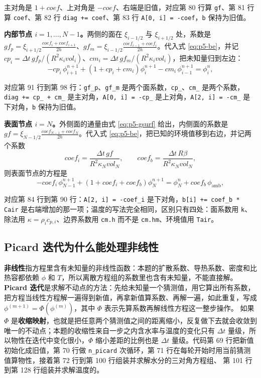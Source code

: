 主对角是 $1+coef$、上对角是 $-coef$、右端是旧值，对应第 80 行算 \texttt{gf}、第 81 行算 \texttt{coef}、第 82 行 \texttt{diag += coef}、第 83 行 \texttt{A[0, i] = -coef}，\texttt{b} 保持为旧值。

\textbf{内部节点 $i=1,\dots,N-1$。}两侧的面在 $\xi_{i-1/2}$ 与 $\xi_{i+1/2}$ 处，系数是 $gf_p=\xi_{i+1/2}\frac{coef_i+coef_{i+1}}{2h}$、$gf_m=\xi_{i-1/2}\frac{coef_{i-1}+coef_i}{2h}$。代入式 \eqref{eq:p5-be}，并记 $cp_i=\Delta t\,gf_p/(R^2\kappa_ivol_i)$、$cm_i=\Delta t\,gf_m/(R^2\kappa_ivol_i)$，把未知量归到左边：
\begin{equation}
-cp_i\,\phi_{i+1}^{n+1}+\left(1+cp_i+cm_i\right)\phi_i^{n+1}-cm_i\,\phi_{i-1}^{n+1}=\phi_i^{n},
\end{equation}

对应第 91 行到第 98 行：\texttt{gf\_p}、\texttt{gf\_m} 是两个面系数，\texttt{cp\_}、\texttt{cm\_} 是两个系数，\texttt{diag += cp\_ + cm\_} 是主对角，\texttt{A[0, i] = -cp\_} 是上对角，\texttt{A[2, i] = -cm\_} 是下对角，\texttt{b} 保持为旧值。

\textbf{表面节点 $i=N$。}外侧面的通量由式 \eqref{eq:p5-gsurf} 给出，内侧面的系数是 $gf=\xi_{N-1/2}\frac{coef_{N-1}+coef_N}{2h}$。代入式 \eqref{eq:p5-be}，把已知的环境值移到右边，并记两个系数
\begin{equation}
coef_i=\frac{\Delta t\,gf}{R^2\kappa_Nvol_N},\qquad
coef_b=\frac{\Delta t\,R\beta}{R^2\kappa_Nvol_N},
\label{eq:p5-surfcoef}
\end{equation}
则表面节点的方程是
\begin{equation}
-coef_i\,\phi_{N-1}^{n+1}+\left(1+coef_i+coef_b\right)\phi_N^{n+1}
=\phi_N^{n}+coef_b\,\phi_{\text{amb}},
\end{equation}

对应第 84 行到第 90 行：\texttt{A[2, i] = -coef\_i} 是下对角，\texttt{b[i] += coef\_b * Cair} 是右端增加的那一项；温度的写法完全相同，区别只有四处：面系数用 \texttt{k}、除法用 $\kappa=\rho_ic_{p,i}$、边界系数用 \texttt{cm.h} 而不是 \texttt{cm.hm}、环境值用 \texttt{Tair}。

\subsection{Picard 迭代为什么能处理非线性}

\textbf{非线性}指方程里含有未知量的非线性函数：本题的扩散系数、导热系数、密度和比热容都依赖 $\phi$ 和 $T$，所以离散方程组的系数里也含有未知量，不能直接解。\textbf{Picard 迭代}是求解不动点的方法：先给未知量一个猜测值，用它算出所有系数，把方程当线性方程解一遍得到新值，再拿新值算系数、再解一遍，如此重复，写成 $\phi^{(m+1)}=\Phi\left(\phi^{(m)}\right)$，其中 $\Phi$ 表示先算系数再解线性方程这一整步操作。
如果 $\Phi$ 是\textbf{收缩映射}，也就是把任意两个猜测值之间的距离缩小，反复做下去就会收敛到唯一的不动点；本题的收缩性来自一步之内含水率与温度的变化只有 $\Delta t$ 量级，所以物性在迭代中变化很小，$\Phi$ 缩小差距的比例也是 $\Delta t$ 量级。代码第 69 行把新值初始化成旧值，第 70 行做 \texttt{n\_picard} 次循环，第 71 行在每轮开始时用当前猜测值算物性，接着第 72 行到第 100 行组装并求解水分的三对角方程组、
第 101 行到第 128 行组装并求解温度的。

